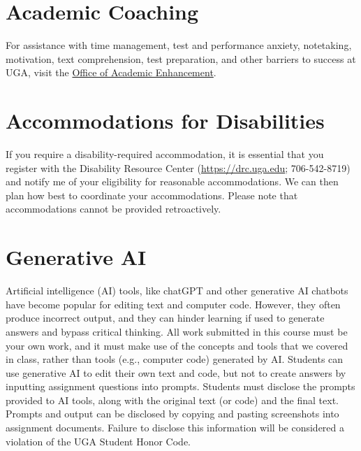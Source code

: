 \documentclass[12pt]{article}
\begin{document}
\section*{\normalsize Academic Coaching}
\vspace{-4mm}

For assistance with time management, test and performance anxiety,
notetaking, motivation, text comprehension, test preparation, and
other barriers to success at UGA, visit the
\href{https://dae.uga.edu/services/academic-coaching/}{Office of Academic Enhancement}. 

\section*{\normalsize Accommodations for Disabilities}
\vspace{-4mm}

If you require a disability-required accommodation, it is essential
that you register with the Disability Resource Center
(\url{https://drc.uga.edu}; 706-542-8719) 
and notify me of your eligibility for reasonable accommodations. We
can then plan how best to coordinate your accommodations. Please note
that accommodations cannot be provided retroactively.



\section*{\normalsize Generative AI}
\vspace{-4mm}


Artificial intelligence (AI) tools, like chatGPT and other generative AI
chatbots have become popular for editing text and computer code. However,
they often produce incorrect output, and they can hinder learning if
used to generate answers and bypass critical thinking. All work
submitted in this course must be your own work, and it must make use
of the concepts and tools that we covered in class, rather than tools
(e.g., computer code) generated by AI. Students can use generative AI
to edit their own text and code, but not to create answers by
inputting assignment questions into prompts. Students must disclose
the prompts provided to  AI tools, along with the original text (or
code) and the final text. Prompts and output can be disclosed by
copying and pasting screenshots into assignment documents. Failure to
disclose this information will be considered a violation of the UGA
Student Honor Code.
\end{document}
